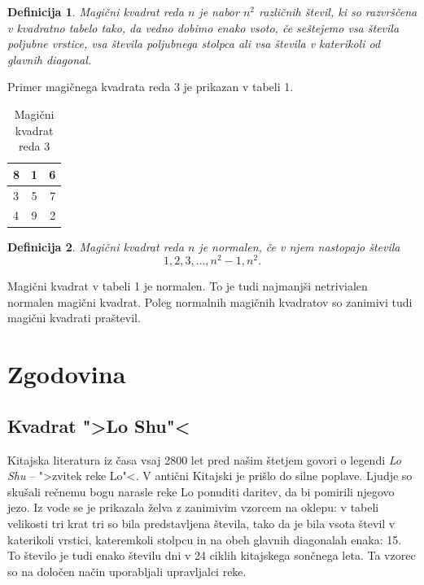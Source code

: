 \documentclass[a4paper,12pt]{article}
\newtheorem{definicija}{Definicija}
\begin{document}
\begin{definicija}
   \emph{Magični kvadrat} reda $n$ je nabor $n^2$ različnih števil,
   ki so razvrščena v kvadratno tabelo tako, da vedno dobimo enako vsoto,
   če seštejemo vsa števila poljubne vrstice, vsa števila poljubnega
   stolpca ali vsa števila v katerikoli od glavnih diagonal.
\end{definicija}

Primer magičnega kvadrata reda 3 je prikazan v tabeli 1.

\begin {table}[h!]
   \begin{center}
      \caption{Magični kvadrat reda 3}
      \label{tab:table1}
      \begin{tabular}{l | c | r}
         8 & 1 & 6 \\\hline
         3 & 5 & 7 \\\hline
         4 & 9 & 2 \\\hline
      \end{tabular}
   \end{center}
\end{table}

\begin{definicija}
   Magični kvadrat reda $n$ je \emph{normalen}, če v njem nastopajo števila
   \begin{equation}
      1, 2, 3, \ldots, n^2-1, n^2.
   \end{equation}
\end{definicija}

Magični kvadrat v tabeli 1 je normalen.
To je tudi najmanjši netrivialen normalen magični kvadrat.
Poleg normalnih magičnih kvadratov so zanimivi tudi magični kvadrati praštevil.

\section{Zgodovina}

\subsection{Kvadrat ">Lo Shu"<}

Kitajska literatura iz časa vsaj 2800 let pred našim štetjem govori o legendi
\emph{Lo Shu} -- ">zvitek reke Lo"<. V antični Kitajski je prišlo do
silne poplave. Ljudje so skušali rečnemu bogu narasle reke Lo ponuditi daritev,
da bi pomirili njegovo jezo. Iz vode se je prikazala želva z zanimivim vzorcem
na oklepu: v tabeli velikosti tri krat tri so bila predstavljena števila, tako
da je bila vsota števil v katerikoli vrstici, kateremkoli stolpcu in na obeh
glavnih diagonalah enaka: 15. To število je tudi enako številu dni v 24 ciklih
kitajskega sončnega leta. Ta vzorec so na določen način uporabljali upravljalci
reke.
\end{document}
